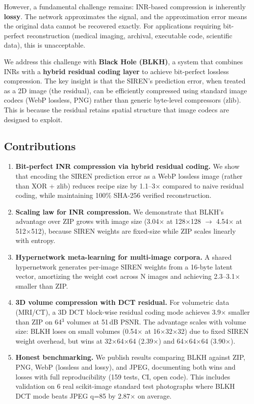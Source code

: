 \documentclass[11pt,a4paper]{article}
\begin{document}
However, a fundamental challenge remains: INR-based compression is inherently \textbf{lossy}. The network approximates the signal, and the approximation error means the original data cannot be recovered exactly. For applications requiring bit-perfect reconstruction (medical imaging, archival, executable code, scientific data), this is unacceptable.

We address this challenge with \textbf{Black Hole (BLKH)}, a system that combines INRs with a \textbf{hybrid residual coding layer} to achieve bit-perfect lossless compression. The key insight is that the SIREN's prediction error, when treated as a 2D image (the residual), can be efficiently compressed using standard image codecs (WebP lossless, PNG) rather than generic byte-level compressors (zlib). This is because the residual retains spatial structure that image codecs are designed to exploit.

\subsection{Contributions}

\begin{enumerate}[leftmargin=*]
    \item \textbf{Bit-perfect INR compression via hybrid residual coding.} We show that encoding the SIREN prediction error as a WebP lossless image (rather than XOR + zlib) reduces recipe size by 1.1--3$\times$ compared to naive residual coding, while maintaining 100\% SHA-256 verified reconstruction.

    \item \textbf{Scaling law for INR compression.} We demonstrate that BLKH's advantage over ZIP grows with image size (3.04$\times$ at 128$\times$128 $\to$ 4.54$\times$ at 512$\times$512), because SIREN weights are fixed-size while ZIP scales linearly with entropy.

    \item \textbf{Hypernetwork meta-learning for multi-image corpora.} A shared hypernetwork generates per-image SIREN weights from a 16-byte latent vector, amortizing the weight cost across N images and achieving 2.3--3.1$\times$ smaller than ZIP.

    \item \textbf{3D volume compression with DCT residual.} For volumetric data (MRI/CT), a 3D DCT block-wise residual coding mode achieves 3.9$\times$ smaller than ZIP on 64$^3$ volumes at 51\,dB PSNR. The advantage scales with volume size: BLKH loses on small volumes (0.54$\times$ at 16$\times$32$\times$32) due to fixed SIREN weight overhead, but wins at 32$\times$64$\times$64 (2.39$\times$) and 64$\times$64$\times$64 (3.90$\times$).

    \item \textbf{Honest benchmarking.} We publish results comparing BLKH against ZIP, PNG, WebP (lossless and lossy), and JPEG, documenting both wins and losses with full reproducibility (159 tests, CI, open code). This includes validation on 6 real scikit-image standard test photographs where BLKH DCT mode beats JPEG q=85 by 2.87$\times$ on average.
\end{enumerate}
\end{document}

